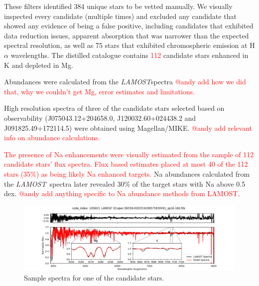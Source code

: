 \documentclass[a4paper,fleqn,usenatbib]{mnras}
\newcommand{\todo}[1]{\textcolor{red}{#1}}
\newcommand{\project}[1]{\emph{#1}}
\newcommand{\lamost}{\project{LAMOST}}
\begin{document}
These filters identified 384 unique stars to be vetted manually. We visually inspected every candidate (multiple times) and excluded any candidate that showed any evidence of being a false positive, including candidates that exhibited data reduction issues, apparent absorption that was narrower than the expected spectral resolution, as well as 75 stars that exhibited chromospheric emission at H$\alpha$ wavelengths. The distilled catalogue contains \todo{112} candidate stars enhanced in K and depleted in Mg.

Abundances were calculated from the \lamost spectra \todo{@andy add how we did that, why we couldn't get Mg, error estimates and limitations.}

High resolution spectra of three of the candidate stars selected based on observability (J075043.12+204658.0, J120032.60+024438.2 and J091825.49+172114.5) were obtained using Magellan/MIKE. \todo{@andy add relevant info on abundance calculations.}

\todo{The presence of Na enhancements were visually estimated from the sample of 112 candidate stars' flux spectra. Flux based estimates placed at most 40 of the 112 stars (35\%) as being likely Na enhanced targets.} Na abundances calculated from the \lamost\ spectra later revealed 30\% of the target stars with Na above 0.5 dex. \todo{@andy add anything specific to Na abundance methods from LAMOST}.


\begin{figure}
	\includegraphics[width=\columnwidth]{posterchildof13.png}
    \caption{Sample spectra for one of the candidate stars.}
    \label{posterchild}
\end{figure}
\end{document}
